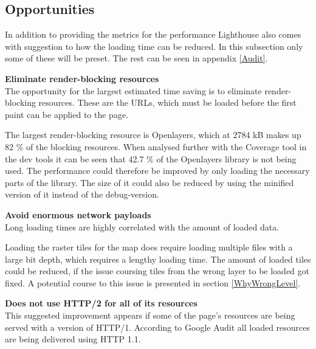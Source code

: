 \subsection{Opportunities}\label{Opportunities}
In addition to providing the metrics for the performance Lighthouse also comes with suggestion to how the loading time can be reduced. In this subsection only some of these will be preset. The rest can be seen in appendix \ref{Audit}.

\textbf{Eliminate render-blocking resources}\\
The opportunity for the largest estimated time saving is to eliminate render-blocking resources. These are the URLs, which must be loaded before the first paint can be applied to the page. \citep{RenderBlocking}

The largest render-blocking resource is Openlayers, which at 2784 kB makes up 82 \% of the blocking resources. When analysed further with the Coverage tool in the dev tools it can be seen that 42.7 \% of the Openlayers library is not being used. The performance could therefore be improved by only loading the necessary parts of the library. The size of it could also be reduced by using the minified version of it instead of the debug-version.
 


%
%

\textbf{Avoid enormous network payloads}\\
Long loading times are highly correlated with the amount of loaded data.  
\citep{LoadingTooMuch}

Loading the raster tiles for the map does require loading multiple files with a large bit depth, which requires a lengthy loading time. The amount of loaded tiles could be reduced, if the issue coursing tiles from the wrong layer to be loaded got fixed. A potential course to this issue is presented in section \ref{WhyWrongLevel}.

\textbf{Does not use HTTP/2 for all of its resources}\\
This suggested improvement appears if some of the page’s resources are being served with a version of HTTP/1. According to Google Audit all loaded resources are being delivered using HTTP 1.1.
\citep{HTTP2}

